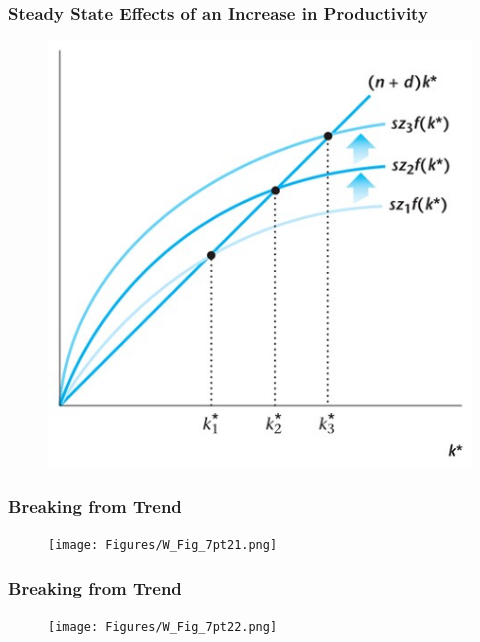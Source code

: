 \documentclass{beamer}
\begin{document}
\begin{frame}
\frametitle[alignment=center]{Steady State Effects of an Increase in Productivity}
\begin{figure}
\centering
\includegraphics[scale=0.5]{Figures/W_Fig_7pt20.png}
\end{figure}
\end{frame}


\begin{frame}
\frametitle[alignment=center]{Breaking from Trend}
\begin{figure}
\centering
\texttt{[image: Figures/W\_Fig\_7pt21.png]}
\end{figure}
\end{frame}

\begin{frame}
\frametitle[alignment=center]{Breaking from Trend}
\begin{figure}
\centering
\texttt{[image: Figures/W\_Fig\_7pt22.png]}
\end{figure}
\end{frame}
\end{document}
